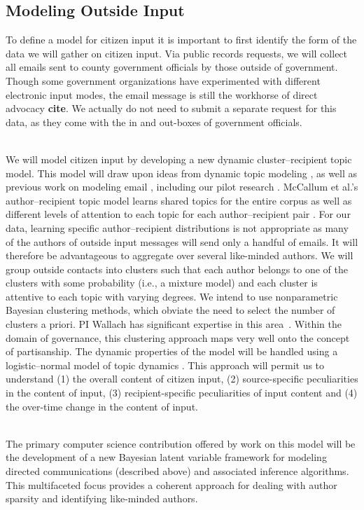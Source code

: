 \subsection{Modeling Outside Input}

 To define a model for citizen input it is important to first identify the form of the data we will gather on citizen input. Via public records requests, we will collect all emails sent to county government officials by those outside of government. Though some government organizations have experimented with different electronic input modes, the email message is still the workhorse of direct advocacy {\bf cite}. We actually do not need to submit a separate request for this data, as they come with the in and out-boxes of government officials.

~\\
 We will model citizen input by
developing a new dynamic cluster--recipient topic model. This model
will draw upon ideas from dynamic topic modeling \cite{Blei2006}, as
well as previous work on modeling email \cite{McCallum2005}, including
our pilot research \cite{Krafft2012}. McCallum et al.'s
author--recipient topic model learns shared topics for the entire
corpus as well as different levels of attention to each topic for each
author--recipient pair \cite{McCallum2005}. For our data, learning
specific author--recipient distributions is not appropriate as many of
the authors of outside input messages will send only a handful of
emails. It will therefore be advantageous to aggregate over several
like-minded authors. We will group outside contacts into clusters such
that each author belongs to one of the clusters with some probability
(i.e., a mixture model) and each cluster is attentive to each topic
with varying degrees. We intend to use nonparametric Bayesian
clustering methods, which obviate the need to select the number of
clusters a priori. PI Wallach has significant expertise in this
area~\cite{Wallach2008,Wallach2010}. Within the domain of governance,
this clustering approach maps very well onto the concept of partisanship. The dynamic properties of the model will be handled using a
logistic--normal model of topic dynamics \cite{Blei2006}. This
approach will permit us to understand (1) the overall content of
citizen input, (2) source-specific peculiarities in the content of
input, (3) recipient-specific peculiarities of input content and (4)
the over-time change in the content of input.

~\\
 The primary computer
science contribution offered by work on this model will be the
development of a new Bayesian latent variable framework for modeling
directed communications (described above) and associated inference
algorithms.  This multifaceted focus provides a coherent approach for
dealing with author sparsity and identifying like-minded authors.

